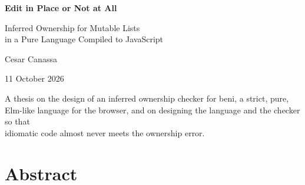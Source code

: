 \documentclass[11pt,a4paper,oneside]{report}
\theoremstyle{definition}
\begin{document}
\hypersetup{pageanchor=false}
\begin{titlepage}
\centering
\vspace*{3cm}
{\LARGE\bfseries Edit in Place or Not at All\par}
\vspace{0.8cm}
{\Large Inferred Ownership for Mutable Lists\\[0.2em] in a Pure Language Compiled to JavaScript\par}
\vspace{2.5cm}
{\large Cesar Canassa\par}
\vspace{0.6cm}
{\large 11 October 2026\par}
\vfill
{\small A thesis on the design of an inferred ownership checker for beni, a strict, pure,\\
Elm-like language for the browser, and on designing the language and the checker so that\\
idiomatic code almost never meets the ownership error.\par}
\vspace*{1cm}
\end{titlepage}
\hypersetup{pageanchor=true}

\chapter*{Abstract}


\tableofcontents

\cleardoublepage
{}















\appendix







\end{document}
